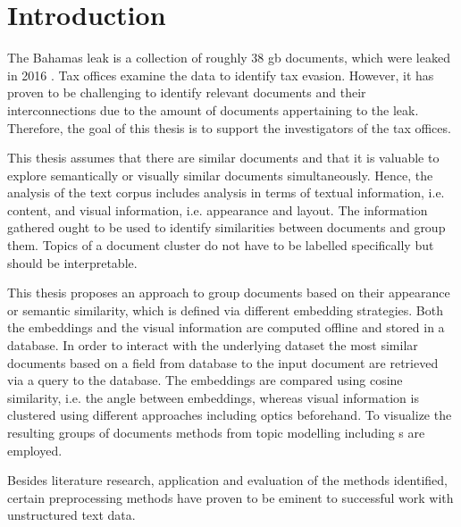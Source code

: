 \chapter{Introduction}\label{ch:introduction}

The Bahamas leak is a collection of roughly 38 \ac{gb} documents, which were leaked in 2016 \cite{data-corpus-bahamas-leaks}.
Tax offices examine the data to identify tax evasion.
However, it has proven to be challenging to identify relevant documents and their interconnections due to the amount of documents appertaining to the leak.
Therefore, the goal of this thesis is to support the investigators of the tax offices.

This thesis assumes that there are similar documents and that it is valuable to explore semantically or visually similar documents simultaneously.
Hence, the analysis of the text corpus includes analysis in terms of textual information, i.e. content, 
and visual information, i.e. appearance and layout.
The information gathered ought to be used to identify similarities between documents and group them.
Topics of a document cluster do not have to be labelled specifically but should be interpretable.

This thesis proposes an approach to group documents based on their appearance or semantic similarity, 
which is defined via different embedding strategies.
Both the embeddings and the visual information are computed offline and stored in a database.
In order to interact with the underlying dataset the most similar documents based on a field from database to the input document are retrieved via a query to the database.
The embeddings are compared using cosine similarity, i.e. the angle between embeddings, 
whereas visual information is clustered using different approaches including \ac{optics} beforehand.
To visualize the resulting groups of documents methods from topic modelling including \wordcloud{}s are employed.

Besides literature research, application and evaluation of the methods identified, 
certain preprocessing methods have proven to be eminent to successful work with unstructured text data.
